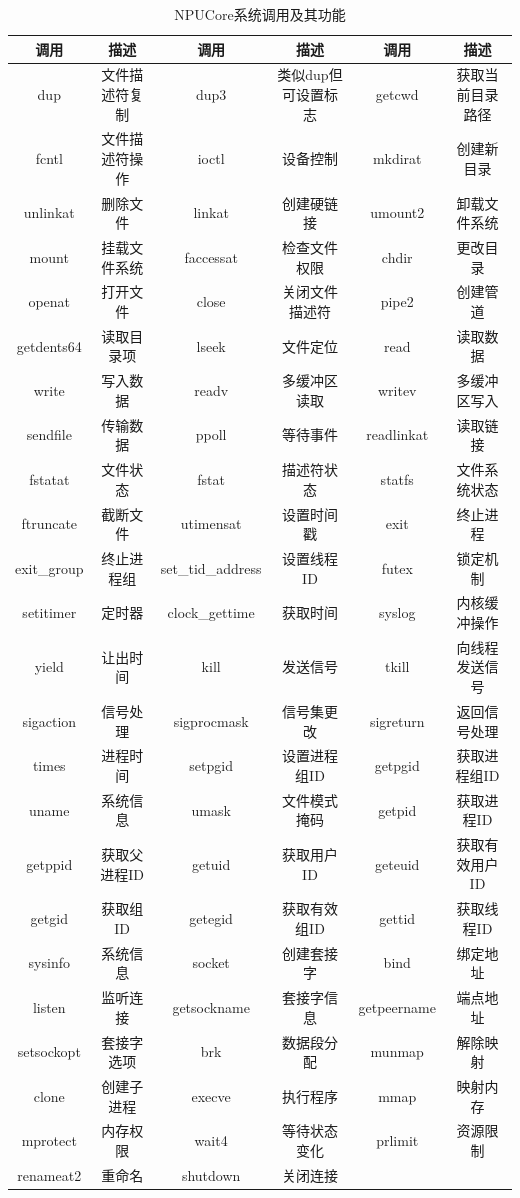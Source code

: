 \begin{table}[h]
\centering
\begin{tabular}{|c|c|c|c|c|c|}
\hline
\textbf{调用} & \textbf{描述} & \textbf{调用} & \textbf{描述} & \textbf{调用} & \textbf{描述} \\
\hline
dup & 文件描述符复制 & dup3 & 类似dup但可设置标志 & getcwd & 获取当前目录路径 \\
fcntl & 文件描述符操作 & ioctl & 设备控制 & mkdirat & 创建新目录 \\
unlinkat & 删除文件 & linkat & 创建硬链接 & umount2 & 卸载文件系统 \\
mount & 挂载文件系统 & faccessat & 检查文件权限 & chdir & 更改目录 \\
openat & 打开文件 & close & 关闭文件描述符 & pipe2 & 创建管道 \\
getdents64 & 读取目录项 & lseek & 文件定位 & read & 读取数据 \\
write & 写入数据 & readv & 多缓冲区读取 & writev & 多缓冲区写入 \\
sendfile & 传输数据 & ppoll & 等待事件 & readlinkat & 读取链接 \\
fstatat & 文件状态 & fstat & 描述符状态 & statfs & 文件系统状态 \\
ftruncate & 截断文件 & utimensat & 设置时间戳 & exit & 终止进程 \\
exit\_group & 终止进程组 & set\_tid\_address & 设置线程ID & futex & 锁定机制 \\
setitimer & 定时器 & clock\_gettime & 获取时间 & syslog & 内核缓冲操作 \\
yield & 让出时间 & kill & 发送信号 & tkill & 向线程发送信号 \\
sigaction & 信号处理 & sigprocmask & 信号集更改 & sigreturn & 返回信号处理 \\
times & 进程时间 & setpgid & 设置进程组ID & getpgid & 获取进程组ID \\
uname & 系统信息 & umask & 文件模式掩码 & getpid & 获取进程ID \\
getppid & 获取父进程ID & getuid & 获取用户ID & geteuid & 获取有效用户ID \\
getgid & 获取组ID & getegid & 获取有效组ID & gettid & 获取线程ID \\
sysinfo & 系统信息 & socket & 创建套接字 & bind & 绑定地址 \\
listen & 监听连接 & getsockname & 套接字信息 & getpeername & 端点地址 \\
setsockopt & 套接字选项 & brk & 数据段分配 & munmap & 解除映射 \\
clone & 创建子进程 & execve & 执行程序 & mmap & 映射内存 \\
mprotect & 内存权限 & wait4 & 等待状态变化 & prlimit & 资源限制 \\
renameat2 & 重命名 & shutdown & 关闭连接 & & \\
\hline
\end{tabular}
\caption{NPUCore系统调用及其功能}
\label{table:syscallscompact}
\end{table}
